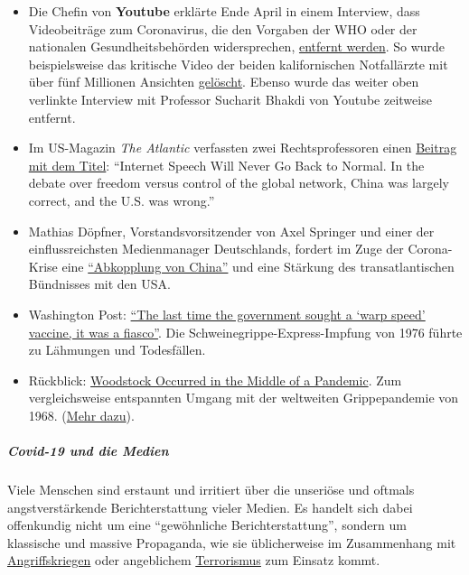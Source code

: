 \begin{itemize}
\tightlist
\item
  Die Chefin von \textbf{Youtube} erklärte Ende April in einem
  Interview, dass Videobeiträge zum Coronavirus, die den Vorgaben der
  WHO oder der nationalen Gesundheitsbehörden widersprechen,
  \href{https://www.businessinsider.com/youtube-will-ban-anything-against-who-guidance-2020-4}{entfernt
  werden}. So wurde beispielsweise das kritische Video der beiden
  kalifornischen Notfallärzte mit über fünf Millionen Ansichten
  \href{https://www.turnto23.com/news/coronavirus/video-interview-with-dr-dan-erickson-and-dr-artin-massihi-taken-down-from-youtube}{gelöscht}.
  Ebenso wurde das weiter oben verlinkte Interview mit Professor
  Sucharit Bhakdi von Youtube zeitweise entfernt.
\item
  Im US-Magazin \emph{The Atlantic} verfassten zwei Rechtsprofessoren
  einen
  \href{https://www.theatlantic.com/ideas/archive/2020/04/what-covid-revealed-about-internet/610549/}{Beitrag
  mit dem Titel}: ``Internet Speech Will Never Go Back to Normal. In the
  debate over freedom versus control of the global network, China was
  largely correct, and the U.S. was wrong.''
\item
  Mathias Döpfner, Vorstandsvorsitzender von Axel Springer und einer der
  einflussreichsten Medienmanager Deutschlands, fordert im Zuge der
  Corona-Krise eine
  \href{https://www.german-foreign-policy.com/news/detail/8263/}{``Abkopplung
  von China''} und eine Stärkung des transatlantischen Bündnisses mit
  den USA.
\item
  Washington Post:
  \href{https://www.washingtonpost.com/history/2020/05/01/vaccine-swine-flu-coronavirus/}{``The
  last time the government sought a `warp speed' vaccine, it was a
  fiasco''}. Die Schweinegrippe-Express-Impfung von 1976 führte zu
  Lähmungen und Todesfällen.
\item
  Rückblick:
  \href{https://www.aier.org/article/woodstock-occurred-in-the-middle-of-a-pandemic/}{Woodstock
  Occurred in the Middle of a Pandemic}. Zum vergleichsweise entspannten
  Umgang mit der weltweiten Grippepandemie von 1968.
  (\href{https://www.britannica.com/event/Hong-Kong-flu-of-1968}{Mehr
  dazu}).
\end{itemize}

\hypertarget{covid-19-und-die-medien}{%
\subparagraph{\texorpdfstring{\textbf{Covid-19 und die
Medien}}{Covid-19 und die Medien}}\label{covid-19-und-die-medien}}

Viele Menschen sind erstaunt und irritiert über die unseriöse und
oftmals angstverstärkende Berichterstattung vieler Medien. Es handelt
sich dabei offenkundig nicht um eine ``gewöhnliche Berichterstattung'',
sondern um klassische und massive Propaganda, wie sie üblicherweise im
Zusammenhang mit
\href{https://swprs.org/propaganda-im-jugoslawienkrieg/}{Angriffskriegen}
oder angeblichem
\href{https://www.motherjones.com/politics/2013/01/terror-factory-fbi-trevor-aaronson-book/}{Terrorismus}
zum Einsatz kommt.

